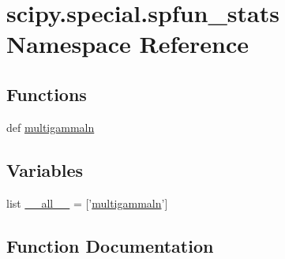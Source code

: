 \hypertarget{namespacescipy_1_1special_1_1spfun__stats}{}\section{scipy.\+special.\+spfun\+\_\+stats Namespace Reference}
\label{namespacescipy_1_1special_1_1spfun__stats}
\subsection*{Functions}
\begin{DoxyCompactItemize}
\item 
def \hyperlink{namespacescipy_1_1special_1_1spfun__stats_a2bad573e445ebb4792896f1528c3282d}{multigammaln}
\end{DoxyCompactItemize}
\subsection*{Variables}
\begin{DoxyCompactItemize}
\item 
list \hyperlink{namespacescipy_1_1special_1_1spfun__stats_a3c4572ed0da32e2f635fbe5c10831de7}{\+\_\+\+\_\+all\+\_\+\+\_\+} = \mbox{[}'\hyperlink{namespacescipy_1_1special_1_1spfun__stats_a2bad573e445ebb4792896f1528c3282d}{multigammaln}'\mbox{]}
\end{DoxyCompactItemize}


\subsection{Function Documentation}
\hypertarget{namespacescipy_1_1special_1_1spfun__stats_a2bad573e445ebb4792896f1528c3282d}{}
